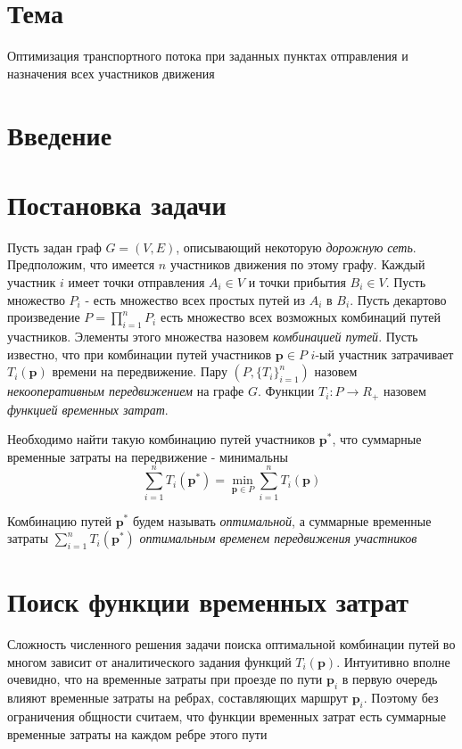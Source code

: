 \documentclass[12pt, a4paper]{article}
\DeclareMathOperator*{\minn}{min}
\begin{document}
 \section*{Тема}
Оптимизация транспортного потока при заданных пунктах отправления и назначения всех участников движения


\section{Введение}


\newpage
\section{Постановка задачи}

Пусть задан граф $G = (V, E)$, описывающий некоторую \textit{дорожную сеть}. Предположим, что имеется $n$ участников движения по этому графу. Каждый участник $i$ имеет точки отправления $A_i \in V$ и точки прибытия $B_i \in V$. Пусть множество $P_i$ - есть множество всех простых путей из $A_i$ в $B_i$. Пусть декартово произведение $P = \prod \limits_{i = 1} ^ n P_i$ есть множество всех возможных комбинаций путей участников. Элементы этого множества назовем \textit{комбинацией путей}. Пусть известно, что при комбинации путей участников $\textbf{p} \in P$ $i$-ый участник затрачивает $T_i(\textbf{p})$ времени на передвижение. Пару $(P, \{T_i\}_{i = 1} ^ n)$ назовем \textit{некооперативным передвижением} на графе $G$. Функции $T_i: P \rightarrow R_+$ назовем \textit{функцией временных затрат}.

Необходимо найти такую комбинацию путей участников $\textbf{p}^*$, что суммарные временные затраты на передвижение - минимальны $$\sum\limits_{i = 1}^n T_i (\textbf{p}^*) = \minn\limits_{ \textbf{p} \in P} \sum\limits_{i = 1}^n T_i (\textbf{p})$$

Комбинацию путей $\textbf{p}^*$ будем называть \textit {оптимальной}, а суммарные временные затраты  $\sum\limits_{i = 1}^n T_i (\textbf{p}^*)$ \textit {оптимальным временем передвижения участников}

\newpage
\section{Поиск функции временных затрат}

Сложность численного решения задачи поиска оптимальной комбинации путей во многом зависит от аналитического задания функций
$T_i (\textbf{p})$. Интуитивно вполне очевидно, что на временные затраты при проезде по пути $\textbf{p}_i$ в первую очередь влияют временные затраты на ребрах, составляющих маршрут $\textbf{p}_i$. Поэтому без ограничения общности считаем, что функции временных затрат есть суммарные временные затраты на каждом ребре этого пути
\end{document}

